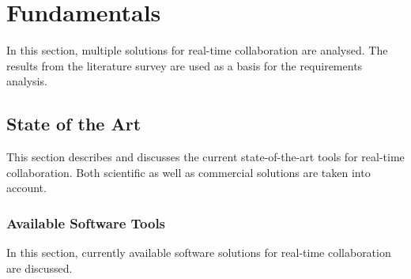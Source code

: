 \chapter{Fundamentals}
\label{sec:fundamentals}

In this section, multiple solutions for real-time collaboration are analysed. 
The results from the literature survey are used as a basis for the requirements analysis.

\section{State of the Art}
\label{sec:stateoftheart}

This section describes and discusses the current state-of-the-art tools for real-time collaboration. Both scientific as well as commercial solutions are taken into account.

\subsection{Available Software Tools}

In this section, currently available software solutions for real-time collaboration are discussed.

